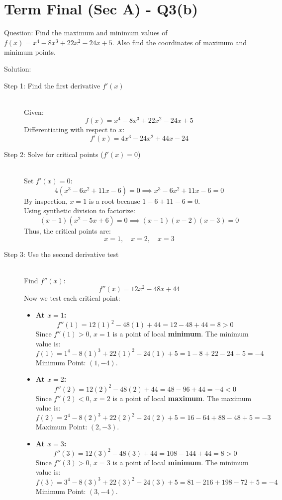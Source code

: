 \documentclass[11pt, a4paper]{article}
\begin{document}
\section*{Term Final (Sec A) - Q3(b)}

Question:
Find the maximum and minimum values of $f(x) = x^4 - 8x^3 + 22x^2 - 24x + 5$. Also find the coordinates of maximum and minimum points.

Solution:

\begin{description}
    \item[Step 1: Find the first derivative $f'(x)$] \ \\
    Given:
    \[ f(x) = x^4 - 8x^3 + 22x^2 - 24x + 5 \]
    Differentiating with respect to $x$:
    \[ f'(x) = 4x^3 - 24x^2 + 44x - 24 \]

    \item[Step 2: Solve for critical points ($f'(x) = 0$)] \ \\
    Set $f'(x) = 0$:
    \[ 4(x^3 - 6x^2 + 11x - 6) = 0 \implies x^3 - 6x^2 + 11x - 6 = 0 \]
    By inspection, $x=1$ is a root because $1 - 6 + 11 - 6 = 0$.\\
    Using synthetic division to factorize:
    \[ (x - 1)(x^2 - 5x + 6) = 0 \implies (x - 1)(x - 2)(x - 3) = 0 \]
    Thus, the critical points are:
    \[ x = 1, \quad x = 2, \quad x = 3 \]

    \item[Step 3: Use the second derivative test] \ \\
    Find $f''(x)$:
    \[ f''(x) = 12x^2 - 48x + 44 \]
    Now we test each critical point:
    \begin{itemize}
        \item \textbf{At $x = 1$:}
        \[ f''(1) = 12(1)^2 - 48(1) + 44 = 12 - 48 + 44 = 8 > 0 \]
        Since $f''(1) > 0$, $x = 1$ is a point of local \textbf{minimum}.
        The minimum value is:
        \[ f(1) = 1^4 - 8(1)^3 + 22(1)^2 - 24(1) + 5 = 1 - 8 + 22 - 24 + 5 = -4 \]
        Minimum Point: $(1, -4)$.

        \item \textbf{At $x = 2$:}
        \[ f''(2) = 12(2)^2 - 48(2) + 44 = 48 - 96 + 44 = -4 < 0 \]
        Since $f''(2) < 0$, $x = 2$ is a point of local \textbf{maximum}.
        The maximum value is:
        \[ f(2) = 2^4 - 8(2)^3 + 22(2)^2 - 24(2) + 5 = 16 - 64 + 88 - 48 + 5 = -3 \]
        Maximum Point: $(2, -3)$.

        \item \textbf{At $x = 3$:}
        \[ f''(3) = 12(3)^2 - 48(3) + 44 = 108 - 144 + 44 = 8 > 0 \]
        Since $f''(3) > 0$, $x = 3$ is a point of local \textbf{minimum}.
        The minimum value is:
        \[ f(3) = 3^4 - 8(3)^3 + 22(3)^2 - 24(3) + 5 = 81 - 216 + 198 - 72 + 5 = -4 \]
        Minimum Point: $(3, -4)$.
    \end{itemize}
\end{description}
\end{document}
